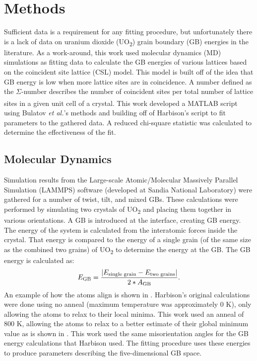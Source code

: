 \documentclass[12pt]{report}
\begin{document}
\chapter{Methods\label{methods}}
Sufficient data is a requirement for any fitting procedure, but unfortunately there is a lack of data on uranium dioxide (UO\textsubscript{2}) grain boundary (GB) energies in the literature.  As a work-around, this work used molecular dynamics (MD) simulations\cite{zhang2016,hansen2016} as fitting data to calculate the GB energies of various lattices based on the coincident site lattice (CSL) model. This model is built off of the idea that GB energy is low when more lattice sites are in coincidence.  A number defined as the $\Sigma$-number describes the number of coincident sites per total number of lattice sites in a given unit cell of a crystal.\cite{lejcek2010, rohrer2011} This work developed a MATLAB\textsuperscript{\textregistered} script using Bulatov \emph{et al.}'s methods\cite{bulatov2014} and building off of Harbison's\cite{harbison2015} script to fit parameters to the gathered data.  A reduced chi-square statistic was calculated to determine the effectiveness of the fit.

\section{Molecular Dynamics\label{methods:MD}}
Simulation results from the Large-scale Atomic/Molecular Massively Parallel Simulation (LAMMPS) software (developed at Sandia National Laboratory\cite{plimpton1995}) were gathered for a number of twist, tilt, and mixed GBs.  These calculations were performed by simulating two crystals of UO\textsubscript{2} and placing them together in various orientations.  A GB is introduced at the interface, creating GB energy.  The energy of the system is calculated from the interatomic forces inside the crystal.  That energy is compared to the energy of a single grain (of the same size as the combined two grains) of UO\textsubscript{2} to determine the energy at the GB.\cite{harbison2015}  The GB energy is calculated as:\cite{butterfield2013}
\begin{equation}
E_{\textnormal{GB}}=\frac{|E_{\textnormal{single grain}} - E_{\textnormal{two grains}}|}{2*A_{\textnormal{GB}}}.
\end{equation} 
An example of how the atoms align is shown in . Harbison's original calculations\cite{harbison2015} were done using no anneal (maximum temperature was approximately 0 K), only allowing the atoms to relax to their local minima.  This work used an anneal of 800 K, allowing the atoms to relax to a better estimate of their global minimum value as is shown in .  This work used the same misorientation angles for the GB energy calculations that Harbison used.  The fitting procedure uses these energies to produce parameters describing the five-dimensional GB space.
\end{document}
